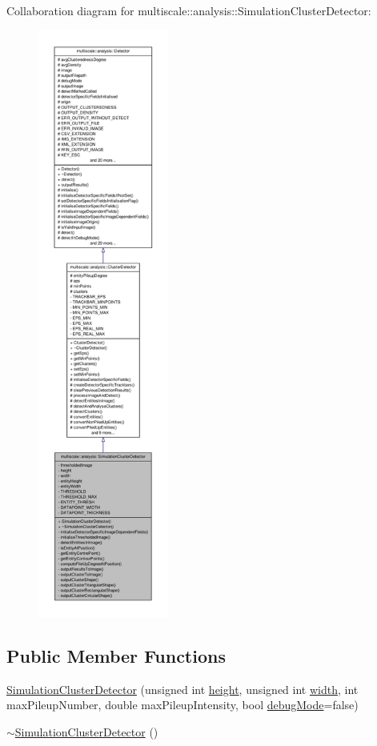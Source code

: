 \-Collaboration diagram for multiscale\-:\-:analysis\-:\-:\-Simulation\-Cluster\-Detector\-:\nopagebreak
\begin{figure}[H]
\begin{center}
\leavevmode
\includegraphics[height=550pt]{classmultiscale_1_1analysis_1_1SimulationClusterDetector__coll__graph}
\end{center}
\end{figure}
\subsection*{\-Public \-Member \-Functions}
\begin{DoxyCompactItemize}
\item 
\hyperlink{classmultiscale_1_1analysis_1_1SimulationClusterDetector_a5ec24468129dfa9b6a7f38e11a78c69b}{\-Simulation\-Cluster\-Detector} (unsigned int \hyperlink{classmultiscale_1_1analysis_1_1SimulationClusterDetector_a9d0a0fe5d9ea0f2516d07bf44b1da257}{height}, unsigned int \hyperlink{classmultiscale_1_1analysis_1_1SimulationClusterDetector_a4c66a82aa1749dce31c767bc4008d904}{width}, int max\-Pileup\-Number, double max\-Pileup\-Intensity, bool \hyperlink{classmultiscale_1_1analysis_1_1Detector_a4b42f796957efd6ee0b8cf7645494a65}{debug\-Mode}=false)
\item 
\hyperlink{classmultiscale_1_1analysis_1_1SimulationClusterDetector_a8df6b5abd6d2dd48e691bf999d35dd43}{$\sim$\-Simulation\-Cluster\-Detector} ()
\end{DoxyCompactItemize}

